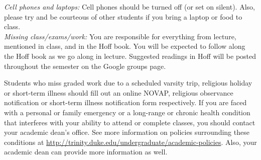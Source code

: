 \documentclass[11pt]{article}
\begin{document}
%
%

\emph{Cell phones and laptops:} Cell phones should be turned off (or set on silent). Also, please try and be courteous of other students if you bring a laptop or food to class. \\


\emph{Missing class/exams/work:}
You are responsible for everything from lecture, mentioned in class, and in the Hoff book. You will be expected to follow along the Hoff book as we go along in lecture. Suggested readings in Hoff will be posted throughout the semester on the Google groups page.  

Students who miss graded work due to a scheduled varsity trip, religious holiday or short-term illness should fill out an online NOVAP, religious observance notification or short-term illness notification form respectively. If you are faced with a personal or family emergency or a long-range or chronic health condition that interferes with your ability to attend or complete classes, you should contact your academic dean's office. See more information on policies surrounding these conditions at \url{http://trinity.duke.edu/undergraduate/academic-policies}. Also, your academic dean can provide more information as well.\\
\end{document}
